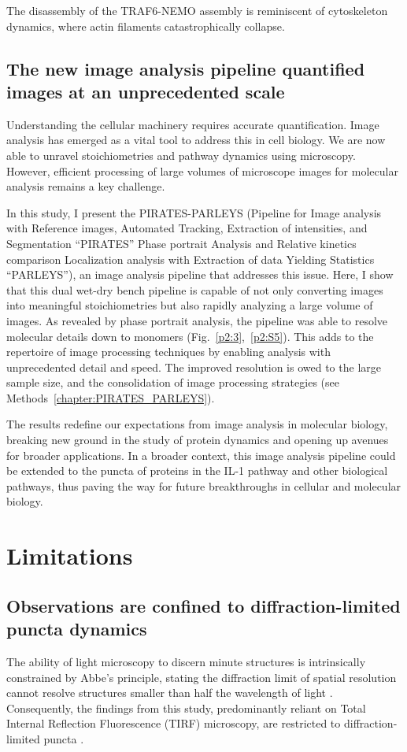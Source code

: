 The disassembly of the TRAF6-NEMO assembly is reminiscent of cytoskeleton dynamics, where actin filaments catastrophically collapse.

\section{The new image analysis pipeline quantified images at an unprecedented scale}
Understanding the cellular machinery requires accurate quantification. Image analysis has emerged as a vital tool to address this in cell biology. We are now able to unravel stoichiometries and pathway dynamics using microscopy. However, efficient processing of large volumes of microscope images for molecular analysis remains a key challenge.

In this study, I present the PIRATES-PARLEYS (Pipeline for Image analysis with Reference images, Automated Tracking, Extraction of intensities, and Segmentation “PIRATES” Phase portrait Analysis and Relative kinetics comparison Localization analysis with Extraction of data Yielding Statistics “PARLEYS”), an image analysis pipeline that addresses this issue. Here, I show that this dual wet-dry bench pipeline is capable of not only converting images into meaningful stoichiometries but also rapidly analyzing a large volume of images. As revealed by phase portrait analysis, the pipeline was able to resolve molecular details down to monomers (Fig.~\ref{p2:3},~\ref{p2:S5}). This adds to the repertoire of image processing techniques by enabling analysis with unprecedented detail and speed. The improved resolution is owed to the large sample size, and the consolidation of image processing strategies (see Methods~\ref{chapter:PIRATES_PARLEYS}).

The results redefine our expectations from image analysis in molecular biology, breaking new ground in the study of protein dynamics and opening up avenues for broader applications. In a broader context, this image analysis pipeline could be extended to the puncta of proteins in the IL-1 pathway and other biological pathways, thus paving the way for future breakthroughs in cellular and molecular biology.

\chapter{Limitations}
\section{Observations are confined to diffraction-limited puncta dynamics}
The ability of light microscopy to discern minute structures is intrinsically constrained by Abbe’s principle, stating the diffraction limit of spatial resolution cannot resolve structures smaller than half the wavelength of light \autocite{Heintzmann_2006}. Consequently, the findings from this study, predominantly reliant on Total Internal Reflection Fluorescence (TIRF) microscopy, are restricted to diffraction-limited puncta \autocite{Ruckstuhl_2003}.

